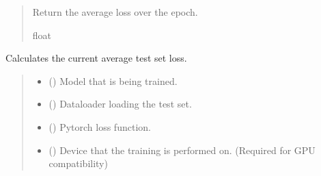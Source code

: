 \documentclass[a4paper,10pt,english]{report}
\begin{document}
\begin{fulllineitems}
\begin{quote}
\begin{description}
\begin{itemize}
\end{itemize}

\sphinxAtStartPar
Return the average loss over the epoch.

\sphinxAtStartPar
float

\end{description}\end{quote}

\end{fulllineitems}


\begin{fulllineitems}
\label{\detokenize{NNucleate:NNucleate.training.test_linear}}
\pysigstartsignatures
{}
\pysigstopsignatures
\sphinxAtStartPar
Calculates the current average test set loss.
\begin{quote}\begin{description}
\begin{itemize}
\item {} 
\sphinxAtStartPar
{} ({\hyperref[\detokenize{NNucleate:NNucleate.models.NNCV}]{}}) \textendash{} Model that is being trained.

\item {} 
\sphinxAtStartPar
{} () \textendash{} Dataloader loading the test set.

\item {} 
\sphinxAtStartPar
{} () \textendash{} Pytorch loss function.

\item {} 
\sphinxAtStartPar
{} () \textendash{} Device that the training is performed on. (Required for GPU compatibility)


\end{itemize}
\end{description}
\end{quote}
\end{fulllineitems}
\end{document}
